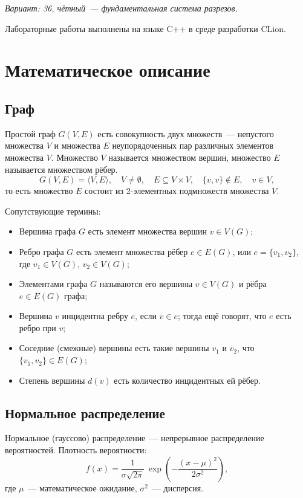 \documentclass[a4paper,final]{article}
\begin{document}
\noindent\textit{Вариант: 36, чётный~--- фундаментальная система разрезов.}

\medskip
Лабораторные работы выполнены на языке C++ в среде разработки CLion.

\newpage
	\section{Математическое описание}
	\subsection{Граф}

Простой граф $G(V, E)$ есть совокупность двух множеств~--- непустого множества $V$ и множества $E$ неупорядоченных пар различных элементов множества $V$. Множество $V$ называется множеством вершин, множество $E$ называется множеством рёбер.
\[
G(V,E) = \langle V, E\rangle,\quad V \neq \emptyset,\quad E \subseteq V \times V,\quad \{v,v\} \notin E,\quad v \in V,
\]
то есть множество $E$ состоит из 2-элементных подмножеств множества $V$.

Сопутствующие термины:
\begin{itemize}
  \item Вершина графа $G$ есть элемент множества вершин $v \in V(G)$;
  \item Ребро графа $G$ есть элемент множества рёбер $e \in E(G)$, или $e = \{v_1, v_2\}$, где $v_1 \in V(G)$, $v_2 \in V(G)$;
  \item Элементами графа $G$ называются его вершины $v \in V(G)$ и рёбра $e \in E(G)$ графа;
  \item Вершина $v$ инцидентна ребру $e$, если $v \in e$; тогда ещё говорят, что $e$ есть ребро при $v$;
  \item Соседние (смежные) вершины есть такие вершины $v_1$ и $v_2$, что $\{v_1,v_2\} \in E(G)$;
  \item Степень вершины $d(v)$ есть количество инцидентных ей рёбер.
\end{itemize}

	\subsection{Нормальное распределение}

Нормальное (гауссово) распределение~--- непрерывное распределение вероятностей. Плотность вероятности:
\[
f(x) = \frac{1}{\sigma\sqrt{2\pi}}\,\exp\!\left(-\frac{(x-\mu)^2}{2\sigma^2}\right),
\]
где $\mu$~--- математическое ожидание, $\sigma^2$~--- дисперсия.
\end{document}
